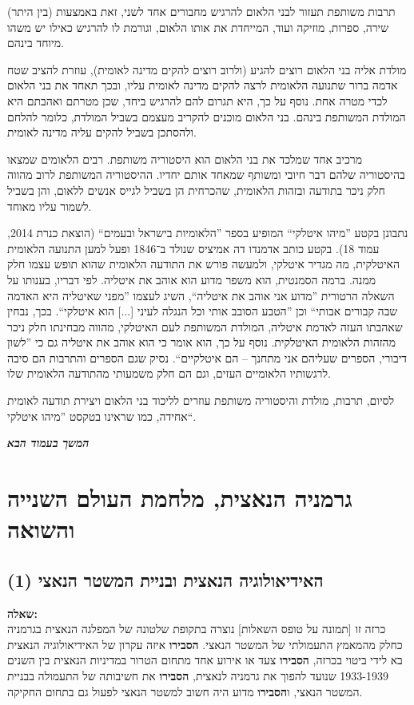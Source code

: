 \documentclass[a4paper]{article}
\newcommand\hl[1]   {#1}
\newcommand\npage {\vfil {\hfil \textbf{\textit{המשך בעמוד הבא}}} \hfil \vfil \pagebreak}
\begin{document}
\begin{enumerate}[A.]
			\hl{תרבות משותפת} תעזור לבני הלאום להרגיש מחבורים אחד לשני, זאת באמצעות (בין היתר) שירה, ספרות, מוזיקה ועוד, המייחדת את אותו הלאום, וגורמת לו להרגיש כאילו יש משהו מיוחד בינהם. 
			
			\hl{מולדת} אליה בני הלאום רוצים להגיע (ולרוב רוצים להקים מדינה לאומית), עוזרת להציב שטח אדמה ברור שתנועה הלאומית לרצה להקים מדינה לאומית עליו, ובכך תאחד את בני הלאום לכדי מטרה אחת. נוסף על כך, היא תגרום להם להרגיש ביחד, שכן מטרתם ואהבתם היא המולדת המשותפת בינהם. בני הלאום מוכנים להקריב מעצמם בשביל המולדת, כלומר להלחם ולהסתכן בשביל להקים עליה מדינה לאומית. 
			
			מרכיב אחד שמלכד את בני הלאום הוא \hl{היסטוריה משותפת}. רבים הלאומים שמצאו בהיסטוריה שלהם דבר חיובי ומשותף שמאחד אותם יחדיו. ההיסטוריה המשותפת לרוב מהווה חלק ניכר בתודעה ובזהות הלאומית, שהכרחית הן בשביל לגייס אנשים ללאום, והן בשביל לשמור עליו מאוחד. 
			
			נתבונן בקטע ''מיהו איטלקי`` המופיע בספר ''הלאומיות בישראל ובעמים`` (הוצאת כנרת 2014, עמוד 18). בקטע כותב אדמנדו דה אמיציס שנולד ב־1846 ופעל למען התנועה הלאומית האיטלקית, מה מגדיר איטלקי, ולמעשה פורש את התודעה הלאומית שהוא תופש עצמו חלק ממנה. ברמה הסמנטית, הוא משפר מדוע הוא אוהב את איטליה. לפי דבריו, בענותו על השאלה הרטורית ''מדוע אני אוהב את איטליה``, השיג לעצמו ''מפני שאיטליה היא האדמה שבה קבורים אבותי`` וכן ''הטבע הסובב אותי וכל הנגלה לעיני [...] הוא איטלקי``. בכך, נבחין שאהבתו העזה לאדמת איטליה, המולדת המשותפת לעם האיטלקי, מהווה מבחינתו חלק ניכר מהזהות הלאומית האיטלקית. נוסף על כך, הוא אומר כי הוא אוהב את איטליה גם כי ''לשון דיבורי, הספרים שעליהם אני מתחנך – הם איטלקיים``. נסיק שגם הספרים והתרבות הם סיבה לרגשותיו הלאומיים העזים, וגם הם חלק משמעותי מהתודעה הלאומית שלו. 
			
			לסיום, תרבות, מולדת והיסטוריה משותפת עוזרים לליכוד בני הלאום ויצירת תודעה לאומית אחידה, כמו שראינו בטקסט ''מיהו איטלקי``. 
			
		\end{enumerate}
		
	
	\npage
	
	\section{גרמניה הנאצית, מלחמת העולם השנייה והשואה}
	\subsection{האידיאולוגיה הנאצית ובניית המשטר הנאצי (1)}
	\textbf{שאלה: }\\
	כרזה זו [תמונה על טופס השאלות] נוצרה בתקופת שלטונה של המפלגה הנאצית בגרמניה כחלק מהמאמץ התעמולתי של המשטר הנאצי. \textbf{הסבירו} איזה עקרון של האידיאולוגיה הנאצית בא לידי ביטוי בכרזה, \textbf{הסבירו} צעד או אירוע אחד מתחום הטרור במדיניות הנאצית בין השנים 1933-1939 שנועד להפוך את גרמניה לנאצית, \textbf{הסבירו} את חשיבותה של התעמולה בבניית המשטר הנאצי, ו\textbf{הסבירו} מדוע היה חשוב למשטר הנאצי לפעול גם בתחום החקיקה. 
	
\end{document}
